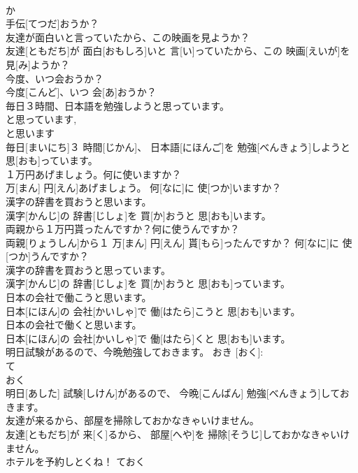 \documentclass[8pt]{extreport}
\begin{document}
\begin{CJK}{UTF8}{min}
\\	か 
\\	手伝[てつだ]おうか？	
\\	友達が面白いと言っていたから、この映画を見ようか？	
\\	友達[ともだち]が 面白[おもしろ]いと 言[い]っていたから、この 映画[えいが]を 見[み]ようか？	
\\	今度、いつ会おうか？	
\\	今度[こんど]、いつ 会[あ]おうか？	
\\	毎日３時間、日本語を勉強しようと思っています。	
\\	と思っています, 
\\	と思います 
\\	毎日[まいにち]３ 時間[じかん]、 日本語[にほんご]を 勉強[べんきょう]しようと 思[おも]っています。	
\\	１万円あげましょう。何に使いますか？	
\\	万[まん] 円[えん]あげましょう。 何[なに]に 使[つか]いますか？	
\\	漢字の辞書を買おうと思います。	
\\	漢字[かんじ]の 辞書[じしょ]を 買[か]おうと 思[おも]います。	
\\	両親から１万円貰ったんですか？何に使うんですか？	
\\	両親[りょうしん]から１ 万[まん] 円[えん] 貰[もら]ったんですか？ 何[なに]に 使[つか]うんですか？	
\\	漢字の辞書を買おうと思っています。	
\\	漢字[かんじ]の 辞書[じしょ]を 買[か]おうと 思[おも]っています。	
\\	日本の会社で働こうと思います。	
\\	日本[にほん]の 会社[かいしゃ]で 働[はたら]こうと 思[おも]います。	
\\	日本の会社で働くと思います。	
\\	日本[にほん]の 会社[かいしゃ]で 働[はたら]くと 思[おも]います。	
\\	明日試験があるので、今晩勉強しておきます。	おき [おく]: 
\\	て 
\\	おく 
\\	明日[あした] 試験[しけん]があるので、 今晩[こんばん] 勉強[べんきょう]しておきます。	
\\	友達が来るから、部屋を掃除しておかなきゃいけません。	
\\	友達[ともだち]が 来[く]るから、 部屋[へや]を 掃除[そうじ]しておかなきゃいけません。	
\\	ホテルを予約しとくね！	ておく 

\end{CJK}
\end{document}
